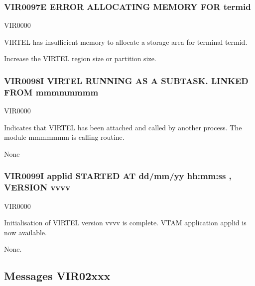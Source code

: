 \documentclass[letterpaper,10pt,english]{sphinxmanual}
\begin{document}
\subsubsection{VIR0097E ERROR ALLOCATING MEMORY FOR termid}
\label{\detokenize{messages:vir0097e-error-allocating-memory-for-termid}}\begin{description}
\sphinxAtStartPar
VIR0000

\sphinxAtStartPar
VIRTEL has insufficient memory to allocate a storage area for terminal termid.

\sphinxAtStartPar
Increase the VIRTEL region size or partition size.

\end{description}


\subsubsection{VIR0098I VIRTEL RUNNING AS A SUBTASK. LINKED FROM mmmmmmmm}
\label{\detokenize{messages:vir0098i-virtel-running-as-a-subtask-linked-from-mmmmmmmm}}\begin{description}
\sphinxAtStartPar
VIR0000

\sphinxAtStartPar
Indicates that VIRTEL has been attached and called by another process. The module mmmmmmm is calling routine.

\sphinxAtStartPar
None

\end{description}


\subsubsection{VIR0099I applid STARTED AT dd/mm/yy hh:mm:ss , VERSION vvvv}
\label{\detokenize{messages:vir0099i-applid-started-at-dd-mm-yy-hh-mm-ss-version-vvvv}}\begin{description}
\sphinxAtStartPar
VIR0000

\sphinxAtStartPar
Initialisation of VIRTEL version vvvv is complete. VTAM application applid is now available.

\sphinxAtStartPar
None.

\end{description}


\subsection{Messages VIR02xxx}
\label{\detokenize{messages:messages-vir02xxx}}
\end{document}
